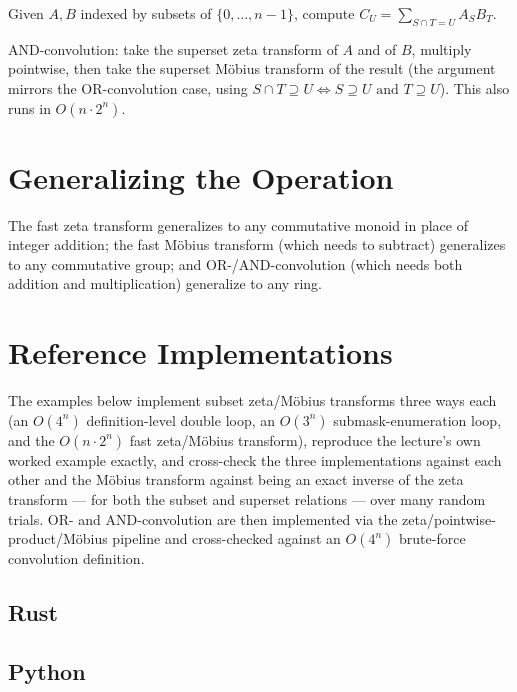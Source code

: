 \documentclass[11pt]{article}
\begin{document}
\begin{definitionbox}
Given $A,B$ indexed by subsets of $\{0,\ldots,n-1\}$, compute
$C_U = \sum_{S\cap T=U} A_SB_T$.
\end{definitionbox}
\begin{theorembox}
AND-convolution: take the superset zeta transform of $A$ and of $B$,
multiply pointwise, then take the superset M\"obius transform of the
result (the argument mirrors the OR-convolution case, using
$S\cap T\supseteq U \iff S\supseteq U \text{ and } T \supseteq U$). This
also runs in $O(n\cdot 2^n)$.
\end{theorembox}

\section{Generalizing the Operation}
The fast zeta transform generalizes to any commutative monoid in place
of integer addition; the fast M\"obius transform (which needs to
subtract) generalizes to any commutative group; and OR-/AND-convolution
(which needs both addition and multiplication) generalize to any ring.

\section{Reference Implementations}
The examples below implement subset zeta/M\"obius transforms three ways
each (an $O(4^n)$ definition-level double loop, an $O(3^n)$
submask-enumeration loop, and the $O(n\cdot 2^n)$ fast zeta/M\"obius
transform), reproduce the lecture's own worked example exactly, and
cross-check the three implementations against each other and the
M\"obius transform against being an exact inverse of the zeta transform
--- for both the subset and superset relations --- over many random
trials. OR- and AND-convolution are then implemented via the
zeta/pointwise-product/M\"obius pipeline and cross-checked against an
$O(4^n)$ brute-force convolution definition.

\codenote
\subsection{Rust}

\subsection{Python}
\end{document}
